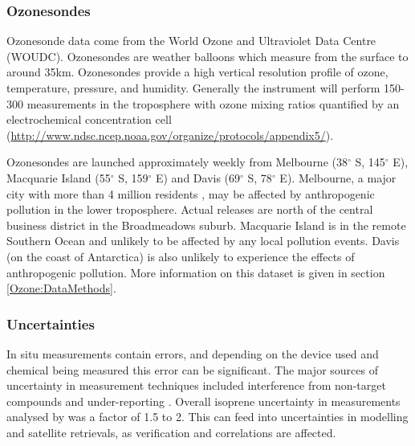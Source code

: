    {\label{Model:Datasets:SPS:fig_series}}
    
    
    
    \subsubsection{Ozonesondes}
    \label{Model:Datasets:ozonesondes}
    
    Ozonesonde data come from the World Ozone and Ultraviolet Data Centre (WOUDC).
    Ozonesondes are weather balloons which measure from the surface to around 35km.
    Ozonesondes provide a high vertical resolution profile of ozone, temperature, pressure, and humidity.
    Generally the instrument will perform 150-300 measurements in the troposphere with ozone mixing ratios quantified by an electrochemical concentration cell (\url{http://www.ndsc.ncep.noaa.gov/organize/protocols/appendix5/}).
    
    Ozonesondes are launched approximately weekly from Melbourne (38$^{\circ}$ S, 145$^{\circ}$ E), Macquarie Island (55$^{\circ}$ S, 159$^{\circ}$ E) and Davis (69$^{\circ}$ S, 78$^{\circ}$ E). 
    Melbourne, a major city with more than 4 million residents \parencite{ABS2016}, may be affected by anthropogenic pollution in the lower troposphere.
    Actual releases are north of the central business district in the Broadmeadows suburb.
    Macquarie Island is in the remote Southern Ocean and unlikely to be affected by any local pollution events.
    Davis (on the coast of Antarctica) is also unlikely to experience the effects of anthropogenic pollution.
    More information on this dataset is given in section \ref{Ozone:DataMethods}.
    
    
    \subsubsection{Uncertainties}
    \label{Model:Datasets:uncertainties}
      
      In situ measurements contain errors, and depending on the device used and chemical being measured this error can be significant.
      The major sources of uncertainty in measurement techniques included interference from non-target compounds and under-reporting \parencite[eg.][]{Dunne2018,Guerette2018}.
      Overall isoprene uncertainty in measurements analysed by \textcite{Dunne2018} was a factor of 1.5 to 2.
      This can feed into uncertainties in modelling and satellite retrievals, as verification and correlations are affected.

